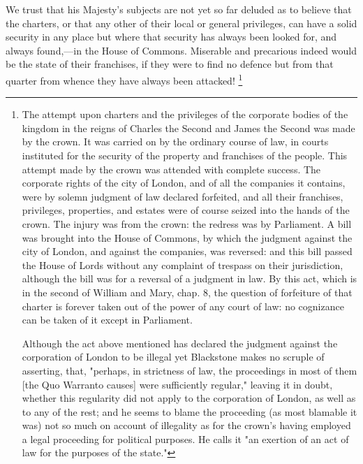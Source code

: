 We trust that his Majesty's subjects are not yet so far deluded as to believe that the charters, or that any other of their local or general privileges, can have a solid security in any place but where that security has always been looked for, and always found,—in the House of Commons. Miserable and precarious indeed would be the state of their franchises, if they were to find no defence but from that quarter from whence they have always been attacked! 
\footnote{ The attempt upon charters and the privileges of the corporate bodies of the kingdom in the reigns of Charles the Second and James the Second was made by the crown. It was carried on by the ordinary course of law, in courts instituted for the security of the property and franchises of the people. This attempt made by the crown was attended with complete success. The corporate rights of the city of London, and of all the companies it contains, were by solemn judgment of law declared forfeited, and all their franchises, privileges, properties, and estates were of course seized into the hands of the crown. The injury was from the crown: the redress was by Parliament. A bill was brought into the House of Commons, by which the judgment against the city of London, and against the companies, was reversed: and this bill passed the House of Lords without any complaint of trespass on their jurisdiction, although the bill was for a reversal of a judgment in law. By this act, which is in the second of William and Mary, chap. 8, the question of forfeiture of that charter is forever taken out of the power of any court of law: no cognizance can be taken of it except in Parliament.

Although the act above mentioned has declared the judgment against the corporation of London to be illegal yet Blackstone makes no scruple of asserting, that, "perhaps, in strictness of law, the proceedings in most of them [the Quo Warranto causes] were sufficiently regular," leaving it in doubt, whether this regularity did not apply to the corporation of London, as well as to any of the rest; and he seems to blame the proceeding (as most blamable it was) not so much on account of illegality as for the crown's having employed a legal proceeding for political purposes. He calls it "an exertion of an act of law for the purposes of the state."

}
